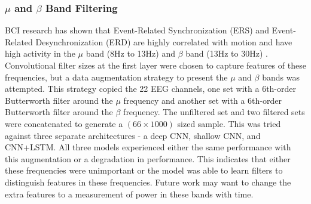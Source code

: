 \documentclass[10pt,twocolumn,letterpaper]{article}
\begin{document}
\subsubsection{$\mu$ and $\beta$ Band Filtering}


BCI research has shown that Event-Related Synchronization (ERS) and
Event-Related Desynchronization (ERD) are highly correlated with motion and have
high activity in the $\mu$ band (8Hz to 13Hz) and $\beta$ band (13Hz to 30Hz)
\cite{yang2013subject}.
Convolutional filter sizes at the first layer were chosen to capture features of
these frequencies, but a data augmentation strategy to present the $\mu$ and
$\beta$ bands was attempted. This strategy copied the 22 EEG channels, one set
with a 6th-order Butterworth filter around the $\mu$ frequency and another set
with a 6th-order Butterworth filter around the $\beta$ frequency. The unfiltered
set and two filtered sets were concatenated to generate a $(66 \times 1000)$
sized sample. This was tried against three separate architectures - a deep CNN,
shallow CNN, and CNN+LSTM. All three models experienced either the same
performance with this augmentation or a degradation in performance. This
indicates that either these frequencies were unimportant or the model was
able to learn filters to distinguish features in these frequencies. Future work
may want to change the extra features to a measurement of power in these bands
with time.

\end{document}
